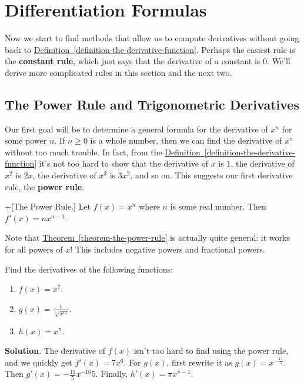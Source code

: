 \documentclass[10pt,]{book}
\newcommand{\terminology}[1]{\textbf{#1}}
\theoremstyle{ptxplainnotitle}
\theoremstyle{ptxplaintitle}
\theoremstyle{ptxplainnotitle}
\theoremstyle{ptxplaintitle}
\theoremstyle{ptxplainnotitle}
\theoremstyle{ptxplaintitle}
\theoremstyle{ptxdefinitionnotitle}
\theoremstyle{ptxdefinitiontitle}
\theoremstyle{ptxdefinitionnotitle}
\theoremstyle{ptxdefinitiontitle}
\theoremstyle{ptxdefinitionnotitle}
\theoremstyle{ptxdefinitiontitle}
\theoremstyle{ptxdefinitionnotitle}
\theoremstyle{ptxdefinitiontitle}
\theoremstyle{ptxdefinitionnotitle}
\theoremstyle{ptxdefinitiontitle}
\numberwithin{equation}{section}
\begin{document}
\section[{Differentiation Formulas}]{Differentiation Formulas}\label{section-differentiation-formulas}
\hypertarget{p-123}{}%
Now we start to find methods that allow us to compute derivatives without going back to \hyperref[definition-the-derivative-function]{Definition~\ref{definition-the-derivative-function}}. Perhaps the easiest rule is the \terminology{constant rule}, which just says that the derivative of a constant is \(0\). We'll derive more complicated rules in this section and the next two.%
\typeout{************************************************}
\typeout{************************************************}
\subsection[{The Power Rule and Trigonometric Derivatives}]{The Power Rule and Trigonometric Derivatives}\label{subsection-the-power-rule-and-trigonometric-derivatives}
\hypertarget{p-124}{}%
Our first goal will be to determine a general formula for the derivative of \(x^{n}\) for some power \(n\). If \(n\geq0\) is a whole number, then we can find the derivative of \(x^{n}\) without too much trouble. In fact, from the \hyperref[definition-the-derivative-function]{Definition~\ref{definition-the-derivative-function}} it's not too hard to show that the derivative of \(x\) is \(1\), the derivative of \(x^{2}\) is \(2x\), the derivative of \(x^{3}\) is \(3x^{2}\), and so on. This suggests our first derivative rule, the \terminology{power rule}.%
\begin{theorem}+[{The Power Rule.}]\label{theorem-the-power-rule}
\hypertarget{p-125}{}%
Let \(f(x) = x^{n}\) where \(n\) is some real number. Then \(f'(x) = nx^{n-1}\).%
\end{theorem}
\hypertarget{p-126}{}%
Note that \hyperref[theorem-the-power-rule]{Theorem~\ref{theorem-the-power-rule}} is actually quite general: it works for all powers of \(x\)! This includes negative powers and fractional powers.%
\begin{example}\label{example-derivatives-using-the-power-rule}
\hypertarget{p-127}{}%
Find the derivatives of the following functions: \leavevmode%
\begin{enumerate}
\item\hypertarget{li-5}{}\(f(x) = x^{7}\).%
\item\hypertarget{li-6}{}\(g(x) = \frac{1}{\sqrt[5]{x^{11}}}\).%
\item\hypertarget{li-7}{}\(h(x) = x^{\pi}\).%
\end{enumerate}
%
\par\smallskip%
\noindent\textbf{Solution}.\hypertarget{solution-26}{}\quad%
\hypertarget{p-128}{}%
The derivative of \(f(x)\) isn't too hard to find using the power rule, and we quickly get \(f'(x) = 7x^{6}\). For \(g(x)\), first rewrite it as \(g(x) = x^{-\frac{11}{5}}\). Then \(g'(x) = -\frac{11}{5}x^{-16}{5}\). Finally, \(h'(x) = \pi x^{\pi-1}\).%
\end{example}
\end{document}
